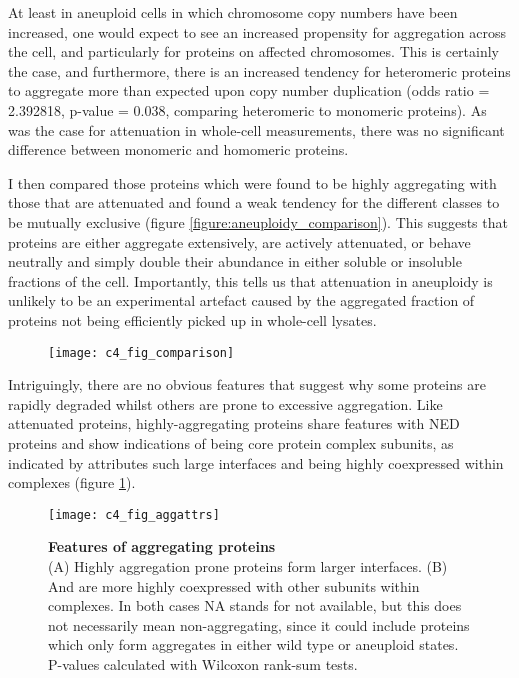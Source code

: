 \documentclass[a4paper,11pt,twoside,openright]{scrbook}
\begin{document}
At least in aneuploid cells in which chromosome copy numbers have been
increased, one would expect to see an increased propensity for aggregation
across the cell, and particularly for proteins on affected chromosomes. This is
certainly the case, and furthermore, there is an increased tendency for
heteromeric proteins to aggregate more than expected upon copy number
duplication (odds ratio = 2.392818, p-value = 0.038, comparing heteromeric to
monomeric proteins). As was the case for attenuation in whole-cell measurements,
there was no significant difference between monomeric and homomeric proteins.

I then compared those proteins which were found to be highly aggregating with
those that are attenuated and found a weak tendency for the different classes to
be mutually exclusive (figure \ref{figure:aneuploidy_comparison}). This suggests
that proteins are either aggregate extensively, are actively attenuated, or
behave neutrally and simply double their abundance in either soluble or
insoluble fractions of the cell. Importantly, this tells us that attenuation in
aneuploidy is unlikely to be an experimental artefact caused by the aggregated
fraction of proteins not being efficiently picked up in whole-cell lysates.

\begin{figure}[h] 
{\texttt{[image: c4\_fig\_comparison]}} \end{figure}

Intriguingly, there are no obvious features that suggest why some proteins are
rapidly degraded whilst others are prone to excessive aggregation. Like
attenuated proteins, highly-aggregating proteins share features with NED
proteins and show indications of being core protein complex subunits, as
indicated by attributes such large interfaces and being highly coexpressed
within complexes (figure \ref{figure:aneuploidy_aggattrs}).

\begin{figure}[h] \texttt{[image: c4\_fig\_aggattrs]} \caption[Features of
    aggregating proteins]{\sffamily \textbf{Features of aggregating proteins} \\
    \small (A) Highly aggregation prone proteins form larger interfaces. (B) And
    are more highly coexpressed with other subunits within complexes. In both
    cases NA stands for not available, but this does not necessarily mean
    non-aggregating, since it could include proteins which only form aggregates
    in either wild type or aneuploid states. P-values calculated with Wilcoxon
    rank-sum tests.} \label{figure:aneuploidy_aggattrs} \end{figure}
\end{document}
